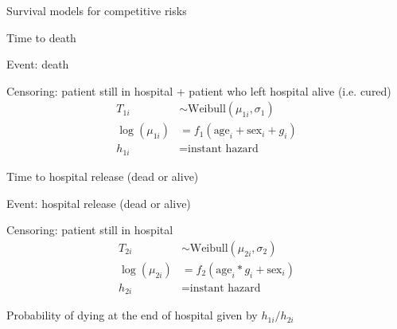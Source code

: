 \documentclass[t,9pt,xcolor=dvipsnames]{beamer}              %
\begin{document}
\begin{frame}{Survival models for competitive risks}
\justifying

\alert{Time to death}

Event: death

Censoring: patient still in hospital + patient who left hospital alive (i.e. cured)
\begin{align*}
T_{1i} & \sim \text{Weibull}(\mu_{1i},\sigma_{1}) \\
\log(\mu_{1i}) & = f_{1}(\text{age}_{i}+\text{sex}_{i}+g_{i}) \\
h_{1i} & = \text{instant hazard}
\end{align*}

\alert{Time to hospital release (dead or alive)}

Event: hospital release (dead or alive)

Censoring: patient still in hospital
\begin{align*}
T_{2i} & \sim \text{Weibull}(\mu_{2i},\sigma_{2}) \\
\log(\mu_{2i}) & = f_{2}(\text{age}_{i}*g_{i}+\text{sex}_{i}) \\
h_{2i} & = \text{instant hazard}
\end{align*}

Probability of dying at the end of hospital given by $h_{1i}/h_{2i}$


\note{
\tiny
\justifying

}
\end{frame}
\end{document}
